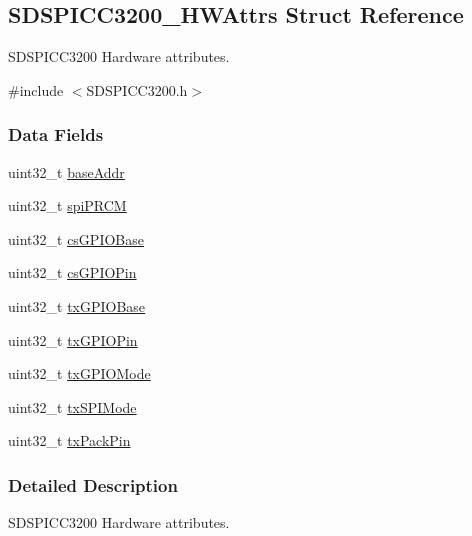 \subsection{S\+D\+S\+P\+I\+C\+C3200\+\_\+\+H\+W\+Attrs Struct Reference}
\label{struct_s_d_s_p_i_c_c3200___h_w_attrs}


S\+D\+S\+P\+I\+C\+C3200 Hardware attributes.  




{\ttfamily \#include $<$S\+D\+S\+P\+I\+C\+C3200.\+h$>$}

\subsubsection*{Data Fields}
\begin{DoxyCompactItemize}
\item 
uint32\+\_\+t \hyperlink{struct_s_d_s_p_i_c_c3200___h_w_attrs_ab719c737801cacc1be5f4d3551553fa4}{base\+Addr}
\item 
uint32\+\_\+t \hyperlink{struct_s_d_s_p_i_c_c3200___h_w_attrs_a5018400a617d0bbdcfcb1fc1361389a8}{spi\+P\+R\+C\+M}
\item 
uint32\+\_\+t \hyperlink{struct_s_d_s_p_i_c_c3200___h_w_attrs_a3e9b0ffd41aa203b0ff23af0e83670e3}{cs\+G\+P\+I\+O\+Base}
\item 
uint32\+\_\+t \hyperlink{struct_s_d_s_p_i_c_c3200___h_w_attrs_a5adaae558104d9339719441e995661f0}{cs\+G\+P\+I\+O\+Pin}
\item 
uint32\+\_\+t \hyperlink{struct_s_d_s_p_i_c_c3200___h_w_attrs_a74e44f74a230a8b73709be421469aaaa}{tx\+G\+P\+I\+O\+Base}
\item 
uint32\+\_\+t \hyperlink{struct_s_d_s_p_i_c_c3200___h_w_attrs_a9428fc65d7331abeedad003fbd53d662}{tx\+G\+P\+I\+O\+Pin}
\item 
uint32\+\_\+t \hyperlink{struct_s_d_s_p_i_c_c3200___h_w_attrs_a6bcfd4de926b3be4315087cf536f8b1b}{tx\+G\+P\+I\+O\+Mode}
\item 
uint32\+\_\+t \hyperlink{struct_s_d_s_p_i_c_c3200___h_w_attrs_a3790f0017a294cda85b96db7e0c0cded}{tx\+S\+P\+I\+Mode}
\item 
uint32\+\_\+t \hyperlink{struct_s_d_s_p_i_c_c3200___h_w_attrs_ac74ef997109f15ab77d18fac98bbf939}{tx\+Pack\+Pin}
\end{DoxyCompactItemize}


\subsubsection{Detailed Description}
S\+D\+S\+P\+I\+C\+C3200 Hardware attributes. 

